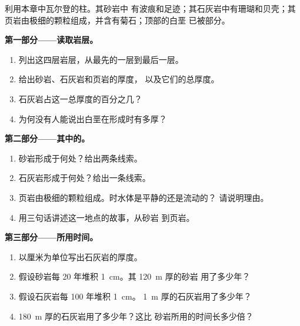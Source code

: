 \begin{problem}
\label{pb:g7:sediments-and-fossils:1}
利用本章中瓦尔登的柱。其砂岩中
有波痕和足迹；其石灰岩中有珊瑚和贝壳；其
页岩由极细的颗粒组成，并含有菊石；顶部的白垩
已被部分。

\medskip
\noindent\textbf{第一部分——读取岩层。}\par\nopagebreak
\begin{enumerate}[beginpenalty=10000]
  \item 列出这四层岩层，从最先的一层到最后一层。
  \item 给出砂岩、石灰岩和页岩的厚度，
        以及它们的总厚度。
  \item 石灰岩占这一总厚度的百分之几？
  \item 为何没有人能说出白垩在形成时有多厚？
\end{enumerate}

\medskip
\noindent\textbf{第二部分——其中的。}\par\nopagebreak
\begin{enumerate}[resume, beginpenalty=10000]
  \item 砂岩形成于何处？给出两条线索。
  \item 石灰岩形成于何处？给出一条线索。
  \item 页岩由极细的颗粒组成。时水体是平静的还是流动的？
        请说明理由。
  \item 用三句话讲述这一地点的故事，从砂岩
        到页岩。
\end{enumerate}

\medskip
\noindent\textbf{第三部分——所用时间。}\par\nopagebreak
\begin{enumerate}[resume, beginpenalty=10000]
  \item 以厘米为单位写出石灰岩的厚度。
  \item 假设砂岩每 20 年堆积 \qty{1}{cm}。其 \qty{120}{m} 厚的砂岩
        用了多少年？
  \item 假设石灰岩每 100 年堆积 \qty{1}{cm}。
        \qty{1}{m} 厚的石灰岩用了多少年？
  \item \qty{180}{m} 厚的石灰岩用了多少年？这比
        砂岩所用的时间长多少倍？
\end{enumerate}
\end{problem}
